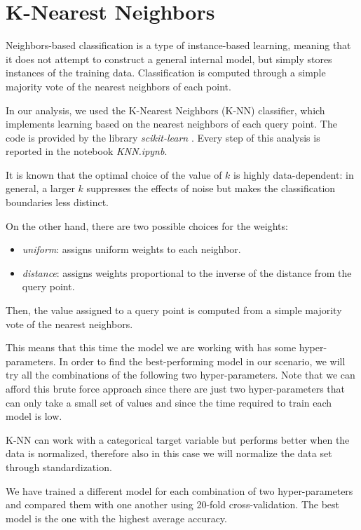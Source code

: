 \documentclass{Configuration_Files/PoliMi3i_thesis}
\begin{document}
\pagebreak


\section{K-Nearest Neighbors}
\label{sec:knn}%
Neighbors-based classification is a type of instance-based learning, meaning that it does not attempt to construct a general internal model, but simply stores instances of the training data. Classification is computed through a simple majority vote of the nearest neighbors of each point.

In our analysis, we used the K-Nearest Neighbors (K-NN) classifier, which implements learning based on the nearest neighbors of each query point. The code is provided by the library \textit{scikit-learn} \cite{scikit-learn}. 
Every step of this analysis is reported in the notebook \textit{KNN.ipynb}.

It is known that the optimal choice of the value of $k$ is highly data-dependent: in general, a larger $k$ suppresses the effects of noise but makes the classification boundaries less distinct.

On the other hand, there are two possible choices for the weights:

\begin{itemize}
    \item \textit{uniform}: assigns uniform weights to each neighbor.
    \item \textit{distance}: assigns weights proportional to the inverse of the distance from the query point. 
\end{itemize}

Then, the value assigned to a query point is computed from a simple majority vote of the nearest neighbors.

This means that this time the model we are working with has some hyper-parameters. In order to find the best-performing model in our scenario, we will try all the combinations of the following two hyper-parameters. Note that we can afford this brute force approach since there are just two hyper-parameters that can only take a small set of values and since the time required to train each model is low.

K-NN can work with a categorical target variable but performs better when the data is normalized, therefore also in this case we will normalize the data set through standardization.

We have trained a different model for each combination of two hyper-parameters and compared them with one another using 20-fold cross-validation. The best model is the one with the highest average accuracy. 
\end{document}
